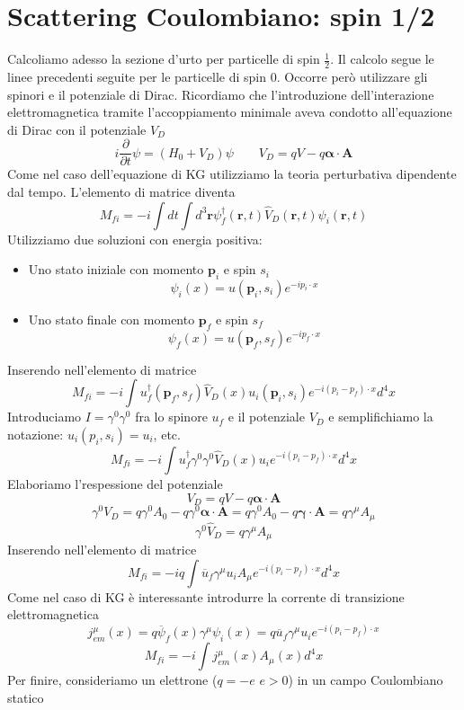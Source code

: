 \section{Scattering Coulombiano: spin 1/2}
Calcoliamo adesso la sezione d'urto per particelle di spin $\frac{1}{2}$. Il calcolo segue le linee precedenti seguite per le particelle di spin 0. Occorre però utilizzare gli spinori e il potenziale di Dirac. Ricordiamo che l'introduzione dell'interazione elettromagnetica tramite l'accoppiamento minimale aveva condotto all'equazione di Dirac con il potenziale $V_D$
$$
i \frac{\partial}{\partial t} \psi = (H_0 + V_D) \psi \qquad V_D = qV - q\boldsymbol{\alpha} \cdot \mathbf{A}
$$
Come nel caso dell'equazione di KG utilizziamo la teoria perturbativa dipendente dal tempo. L'elemento di matrice diventa
$$
M_{fi} = -i \int dt \int d^3\mathbf{r} \psi_f^\dagger(\mathbf{r}, t) \hat{V}_D(\mathbf{r}, t) \psi_i(\mathbf{r}, t)
$$
Utilizziamo due soluzioni con energia positiva:
\begin{itemize}
    \item Uno stato iniziale con momento $\mathbf{p}_i$ e spin $s_i$ 
    $$
    \psi_i(x) = u(\mathbf{p}_i, s_i) e^{-ip_i \cdot x}
    $$
    \item Uno stato finale con momento $\mathbf{p}_f$ e spin $s_f$ 
    $$
    \psi_f(x) = u(\mathbf{p}_f, s_f) e^{-ip_f \cdot x}
    $$
\end{itemize}
Inserendo nell'elemento di matrice 
$$
M_{fi} = -i \int u_f^\dagger(\mathbf{p}_f, s_f) \hat{V}_D(x) u_i(\mathbf{p}_i, s_i) e^{-i(p_i - p_f) \cdot x} d^4x
$$
Introduciamo $I=\gamma^0\gamma^0$ fra lo spinore $u_f$ e il potenziale $V_D$ e semplifichiamo la notazione: $u_i(p_i,s_i)=u_i$, etc.
$$
M_{fi} = -i \int u_f^\dagger \gamma^0 \gamma^0 \hat{V}_D(x) u_i e^{-i(p_i-p_f) \cdot x} d^4x
$$
Elaboriamo l'respessione del potenziale
$$
V_D=qV-q\boldsymbol{\alpha}\cdot\mathbf{A}
$$
$$
\gamma^0 V_D = q\gamma^0 A_0 - q\gamma^0 \boldsymbol{\alpha} \cdot \mathbf{A} = q\gamma^0 A_0 - q\boldsymbol{\gamma} \cdot \mathbf{A} = q\gamma^\mu A_\mu
$$
$$
\gamma^0 \hat{V}_D = q\gamma^\mu A_\mu
$$
Inserendo nell'elemento di matrice
$$
M_{fi} = -iq \int \overline{u}_f \gamma^\mu u_i A_\mu e^{-i(p_i-p_f) \cdot x} d^4x
$$
Come nel caso di KG è interessante introdurre la corrente di transizione elettromagnetica
$$
j_{em}^\mu(x) = q\overline{\psi}_f(x)\gamma^\mu \psi_i(x) = q\overline{u}_f \gamma^\mu u_i e^{-i(p_i-p_f) \cdot x}
$$
$$
M_{fi} = -i \int j_{em}^\mu(x) A_\mu(x) d^4x
$$
Per finire, consideriamo un elettrone ($q=-e$ $e>0$) in un campo Coulombiano statico
